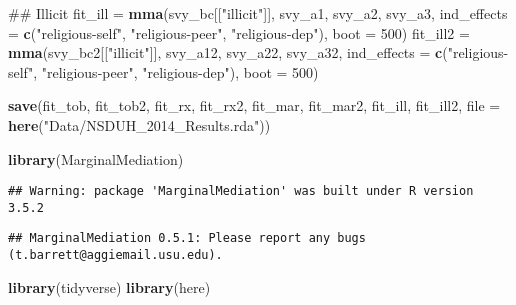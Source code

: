 \documentclass[]{article}
\newenvironment{Shaded}{\begin{snugshade}}{\end{snugshade}}
\newcommand{\KeywordTok}[1]{\textcolor[rgb]{0.13,0.29,0.53}{\textbf{#1}}}
\newcommand{\DataTypeTok}[1]{\textcolor[rgb]{0.13,0.29,0.53}{#1}}
\newcommand{\DecValTok}[1]{\textcolor[rgb]{0.00,0.00,0.81}{#1}}
\newcommand{\StringTok}[1]{\textcolor[rgb]{0.31,0.60,0.02}{#1}}
\newcommand{\NormalTok}[1]{#1}
\begin{document}
\begin{Shaded}
\begin{Highlighting}[]
\NormalTok{## Illicit}
\NormalTok{fit_ill =}\StringTok{ }\KeywordTok{mma}\NormalTok{(svy_bc[[}\StringTok{"illicit"}\NormalTok{]],}
\NormalTok{              svy_a1,}
\NormalTok{              svy_a2,}
\NormalTok{              svy_a3,}
              \DataTypeTok{ind_effects =} \KeywordTok{c}\NormalTok{(}\StringTok{"religious-self"}\NormalTok{,}
                              \StringTok{"religious-peer"}\NormalTok{,}
                              \StringTok{"religious-dep"}\NormalTok{),}
              \DataTypeTok{boot =} \DecValTok{500}\NormalTok{)}
\NormalTok{fit_ill2 =}\StringTok{ }\KeywordTok{mma}\NormalTok{(svy_bc2[[}\StringTok{"illicit"}\NormalTok{]],}
\NormalTok{               svy_a12,}
\NormalTok{               svy_a22,}
\NormalTok{               svy_a32,}
               \DataTypeTok{ind_effects =} \KeywordTok{c}\NormalTok{(}\StringTok{"religious-self"}\NormalTok{,}
                               \StringTok{"religious-peer"}\NormalTok{,}
                               \StringTok{"religious-dep"}\NormalTok{),}
               \DataTypeTok{boot =} \DecValTok{500}\NormalTok{)}

\KeywordTok{save}\NormalTok{(fit_tob, fit_tob2, }
\NormalTok{     fit_rx, fit_rx2, }
\NormalTok{     fit_mar, fit_mar2, }
\NormalTok{     fit_ill, fit_ill2,}
     \DataTypeTok{file =} \KeywordTok{here}\NormalTok{(}\StringTok{"Data/NSDUH_2014_Results.rda"}\NormalTok{))}
\end{Highlighting}
\end{Shaded}

\begin{Shaded}
\begin{Highlighting}[]
\KeywordTok{library}\NormalTok{(MarginalMediation)}
\end{Highlighting}
\end{Shaded}

\begin{verbatim}
## Warning: package 'MarginalMediation' was built under R version 3.5.2
\end{verbatim}

\begin{verbatim}
## MarginalMediation 0.5.1: Please report any bugs (t.barrett@aggiemail.usu.edu).
\end{verbatim}

\begin{Shaded}
\begin{Highlighting}[]
\KeywordTok{library}\NormalTok{(tidyverse)}
\KeywordTok{library}\NormalTok{(here)}
\end{Highlighting}
\end{Shaded}
\end{document}
